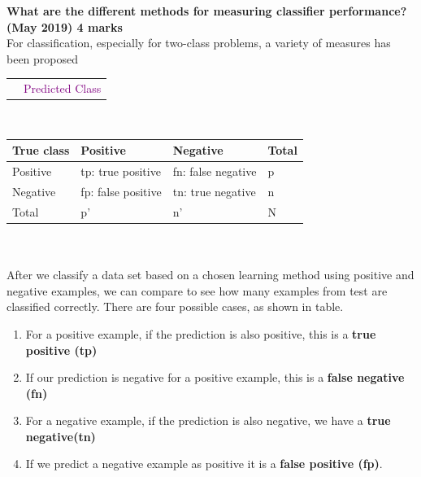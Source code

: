 \textbf{\textcolor{LightMagenta}{ What are the different methods for measuring classifier performance? (May 2019) \hfill 4 marks}} \\[5pt]

For classification, especially for two-class problems, a variety of measures has been proposed \\


\begin{tabular}{|p{2cm}|p{8.075cm}|}
    \hline
    & \textcolor{purple}{Predicted Class} \\
\end{tabular}\\
\begin{tabular}{|p{2cm}|p{3.1cm}|p{3.1cm}|p{1cm}|}
    \hline
     True class & Positive & Negative & Total  \\
     \hline
     Positive & tp: true positive & fn: false negative & p \\
     Negative & fp: false positive & tn: true negative & n \\
     \hline
     Total & p' & n' & N \\
    \hline
\end{tabular}

\\ \\
After we classify a data set based on a chosen learning method using positive and negative
examples, we can compare to see how many examples from test are classified correctly. There are four possible cases, as shown in table.
\begin{enumerate}
    \item {For a positive example, if the prediction is also positive, this is a \textbf{true positive (tp)}}
    \item {If our prediction is negative for a positive example, this is a \textbf{false negative (fn)}}
    \item {For a negative example, if the prediction is also negative, we have a \textbf{true negative(tn)}}
    \item {If we predict a negative example as positive it is a \textbf{false positive (fp)}.}
\end{enumerate} 

